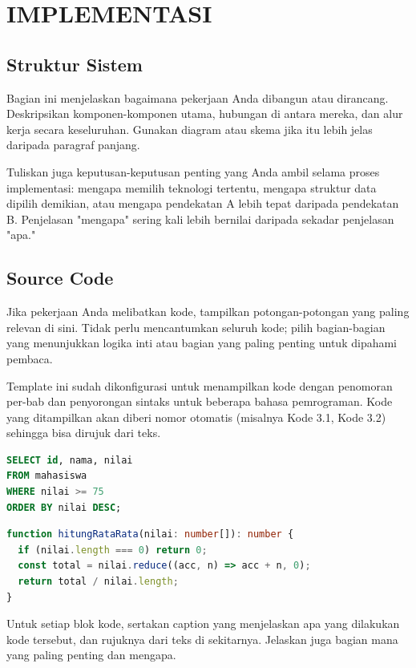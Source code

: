 \chapter{IMPLEMENTASI}

\section{Struktur Sistem}
Bagian ini menjelaskan bagaimana pekerjaan Anda dibangun atau dirancang. Deskripsikan komponen-komponen utama, hubungan di antara mereka, dan alur kerja secara keseluruhan. Gunakan diagram atau skema jika itu lebih jelas daripada paragraf panjang.

Tuliskan juga keputusan-keputusan penting yang Anda ambil selama proses implementasi: mengapa memilih teknologi tertentu, mengapa struktur data dipilih demikian, atau mengapa pendekatan A lebih tepat daripada pendekatan B. Penjelasan "mengapa" sering kali lebih bernilai daripada sekadar penjelasan "apa."

\section{Source Code}
Jika pekerjaan Anda melibatkan kode, tampilkan potongan-potongan yang paling relevan di sini. Tidak perlu mencantumkan seluruh kode; pilih bagian-bagian yang menunjukkan logika inti atau bagian yang paling penting untuk dipahami pembaca.

Template ini sudah dikonfigurasi untuk menampilkan kode dengan penomoran per-bab dan penyorongan sintaks untuk beberapa bahasa pemrograman. Kode yang ditampilkan akan diberi nomor otomatis (misalnya Kode 3.1, Kode 3.2) sehingga bisa dirujuk dari teks.

\begin{lstlisting}[language=SQL, caption={Contoh query SQL}]
SELECT id, nama, nilai
FROM mahasiswa
WHERE nilai >= 75
ORDER BY nilai DESC;
\end{lstlisting}

\begin{lstlisting}[language=TypeScript, caption={Contoh fungsi TypeScript}]
function hitungRataRata(nilai: number[]): number {
  if (nilai.length === 0) return 0;
  const total = nilai.reduce((acc, n) => acc + n, 0);
  return total / nilai.length;
}
\end{lstlisting}

Untuk setiap blok kode, sertakan caption yang menjelaskan apa yang dilakukan kode tersebut, dan rujuknya dari teks di sekitarnya. Jelaskan juga bagian mana yang paling penting dan mengapa.
